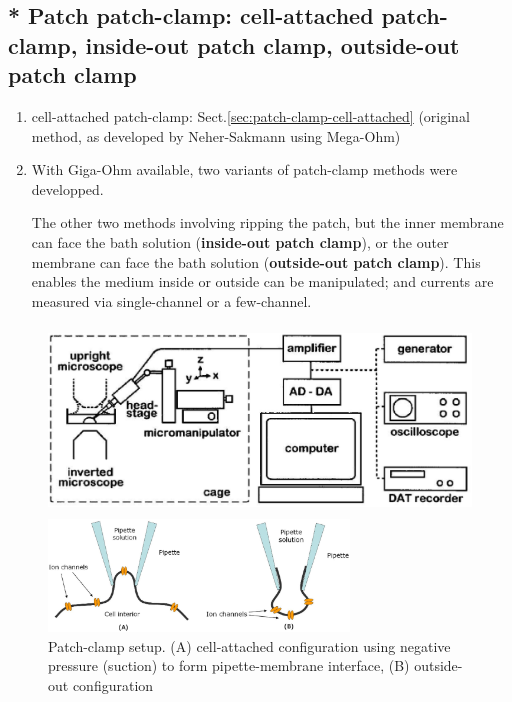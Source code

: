 \subsection{* Patch patch-clamp: cell-attached patch-clamp, inside-out patch
clamp, outside-out patch clamp}
\label{sec:patch-clamp-patch}

\begin{enumerate}
  \item cell-attached patch-clamp: Sect.\ref{sec:patch-clamp-cell-attached}
  (original method, as developed by Neher-Sakmann using Mega-Ohm)
  
  \item With Giga-Ohm available, two variants of patch-clamp methods were
  developped.

The other two methods involving ripping the patch, but the inner
membrane can face the bath solution ({\bf inside-out patch clamp}), or the outer
membrane can face the bath solution ({\bf outside-out patch clamp}).
This enables the medium inside or outside can be manipulated; and currents are
measured via single-channel or a few-channel.
  
\end{enumerate}


\begin{figure}[hbtp]
  \centerline{\includegraphics[height=5cm,
    angle=0]{./images/patch-clamp_setup.eps}}
  \centerline{\includegraphics[height=3cm,
    angle=0]{./images/patch_clamp_options.eps}}
  \caption{Patch-clamp setup. (A) cell-attached configuration using negative
  pressure (suction) to form pipette-membrane interface, (B) outside-out
  configuration}
\label{fig:patch-clamp_setup}
\end{figure}


